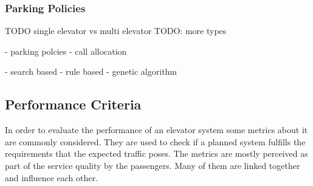 \subsubsection{Parking Policies}

TODO
single elevator  vs multi elevator
TODO: more types

\autocite[][pp.~3--4,10]{beers2015arrivals}
- parking polcies
- call allocation

\autocite[][pp.~3--6]{axelsson2013strategies}
- search based
- rule based
- genetic algorithm




\subsection{Performance Criteria}
\label{sec:sota:perf}

In order to evaluate the performance of an elevator system some metrics about it are commonly considered.
They are used to check if a planned system fulfills the requirements that the expected traffic poses. 
The metrics are mostly perceived as part of the service quality by the passengers.
Many of them are linked together and influence each other.


